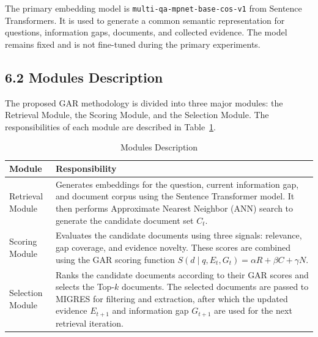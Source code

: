 \documentclass[12pt,a4paper]{report}
\begin{document}
The primary embedding model is \texttt{multi-qa-mpnet-base-cos-v1} from Sentence Transformers. It is used to generate a common semantic representation for questions, information gaps, documents, and collected evidence. The model remains fixed and is not fine-tuned during the primary experiments.
\clearpage
\subsection*{6.2 Modules Description}

The proposed GAR methodology is divided into three major modules: 
the Retrieval Module, the Scoring Module, and the Selection Module. 
The responsibilities of each module are described in Table~\ref{tab:module-description}.

\begin{table}[H]
\centering
\caption{Modules Description}
\label{tab:module-description}
\renewcommand{\arraystretch}{1.25}
\begin{tabular}{|p{1.65in}|p{4.4in}|}
\hline
\textbf{Module} & \textbf{Responsibility} \\ \hline

Retrieval Module &
Generates embeddings for the question, current information gap, and document corpus using the Sentence Transformer model. It then performs Approximate Nearest Neighbor (ANN) search to generate the candidate document set $C_t$. \\ \hline

Scoring Module &
Evaluates the candidate documents using three signals: relevance, gap coverage, and evidence novelty. These scores are combined using the GAR scoring function $S(d \mid q,E_t,G_t) = \alpha R + \beta C + \gamma N$. \\ \hline

Selection Module &
Ranks the candidate documents according to their GAR scores and selects the Top-$k$ documents. The selected documents are passed to MIGRES for filtering and extraction, after which the updated evidence $E_{t+1}$ and information gap $G_{t+1}$ are used for the next retrieval iteration. \\ \hline

\end{tabular}
\end{table}

\clearpage
\end{document}
